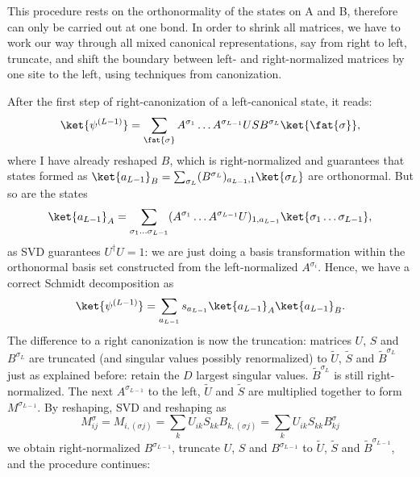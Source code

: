 This procedure rests on the orthonormality of the states on A and B, therefore can only be carried out at one bond. In order to shrink all matrices, we have to work our way through all mixed canonical representations, say from right to left, truncate, and shift the boundary between left- and right-normalized matrices by one site to the left, using techniques from canonization.

After the first step of right-canonization of a left-canonical state, it reads:
\begin{equation}
\ket{\psi^{(L-1)}} = \sum_{\fat{\sigma}} A^{\sigma_1} \ldots A^{\sigma_{L-1}} U S B^{\sigma_L} \ket{\fat{\sigma}} ,
\end{equation}
where I have already reshaped $B$, which is right-normalized and guarantees that states formed as $\ket{a_{L-1}}_B = \sum_{\sigma_L} (B^{\sigma_L})_{a_{L-1},1} \ket{\sigma_L}$ are orthonormal. But so are the states 
\begin{equation}
\ket{a_{L-1}}_A = \sum_{\sigma_1 \ldots \sigma_{L-1}} (A^{\sigma_1} \ldots A^{\sigma_{L-1}} U)_{1,a_{L-1}} \ket{\sigma_1 \ldots \sigma_{L-1}},
\end{equation}
as SVD guarantees $U^\dagger U = 1$: we are just doing a basis transformation within the orthonormal basis set constructed from the left-normalized $A^{\sigma_i}$. Hence, we have a correct Schmidt decomposition as
\begin{equation}
\ket{\psi^{(L-1)}} = \sum_{a_{L-1}} s_{a_{L-1}} \ket{a_{L-1}}_A \ket{a_{L-1}}_B .
\end{equation}
The difference to a right canonization is now the truncation: matrices $U$, $S$ and $B^{\sigma_L}$ are truncated (and singular values possibly renormalized) to $\tilde{U}$, $\tilde{S}$ and $\tilde{B}^{\sigma_L}$ just as explained before: retain the $D$ largest singular values. $\tilde{B}^{\sigma_L}$ is still right-normalized. The next $A^{\sigma_{L-1}}$ to the left, $\tilde{U}$ and $\tilde{S}$ are multiplied together to form $M^{\sigma_{L-1}}$. By reshaping, SVD and reshaping as 
\begin{equation}
M^{\sigma}_{ij} = M_{i, (\sigma j)} = \sum_k U_{ik} S_{kk} B_{k,(\sigma j)} = \sum_k U_{ik} S_{kk} B^{\sigma}_{kj} 
\end{equation} 
we obtain right-normalized $B^{\sigma_{L-1}}$, truncate $U$, $S$ and $B^{\sigma_{L-1}}$ to $\tilde{U}$, $\tilde{S}$ and $\tilde{B}^{\sigma_{L-1}}$, and the procedure continues:
